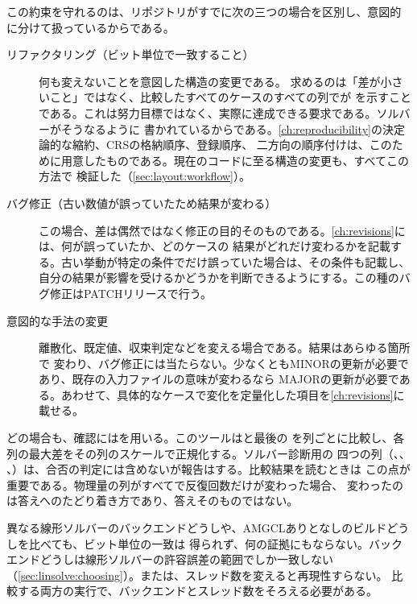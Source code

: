 この約束を守れるのは、リポジトリがすでに次の三つの場合を区別し、意図的に分けて扱っているからである。

\begin{description}

  \item[リファクタリング（ビット単位で一致すること）] 何も変えないことを意図した構造の変更である。
    求めるのは「差が小さいこと」ではなく、比較したすべてのケースのすべての列でが
    を示すことである。これは努力目標ではなく、実際に達成できる要求である。ソルバーがそうなるように
    書かれているからである。\cref{ch:reproducibility}の決定論的な縮約、CRSの格納順序、登録順序、
    二方向の順序付けは、このために用意したものである。現在のコードに至る構造の変更も、すべてこの方法で
    検証した（\cref{sec:layout:workflow}）。

  \item[バグ修正（古い数値が誤っていたため結果が変わる）]
    この場合、差は偶然ではなく修正の目的そのものである。\cref{ch:revisions}には、何が誤っていたか、どのケースの
    結果がどれだけ変わるかを記載する。古い挙動が特定の条件でだけ誤っていた場合は、その条件も記載し、
    自分の結果が影響を受けるかどうかを判断できるようにする。この種のバグ修正はPATCHリリースで行う。

  \item[意図的な手法の変更] 離散化、既定値、収束判定などを変える場合である。結果はあらゆる箇所で
    変わり、バグ修正には当たらない。少なくともMINORの更新が必要であり、既存の入力ファイルの意味が変わるなら
    MAJORの更新が必要である。あわせて、具体的なケースで変化を定量化した項目を\cref{ch:revisions}に載せる。

\end{description}

どの場合も、確認にはを用いる。このツールはと最後の
を列ごとに比較し、各列の最大差をその列のスケールで正規化する。ソルバー診断用の
四つの列（、、
、）は、合否の判定には含めないが報告はする。比較結果を読むときは
この点が重要である。物理量の列がすべてで反復回数だけが変わった場合、
変わったのは答えへのたどり着き方であり、答えそのものではない。

\begin{warn}[比較は同じ条件で行う]
  異なる線形ソルバーのバックエンドどうしや、AMGCLありとなしのビルドどうしを比べても、ビット単位の一致は
  得られず、何の証拠にもならない。バックエンドどうしは線形ソルバーの許容誤差の範囲でしか一致しない
  （\cref{sec:linsolve:choosing}）。または、スレッド数を変えると再現性すらない。
  比較する両方の実行で、バックエンドとスレッド数をそろえる必要がある。
\end{warn}

